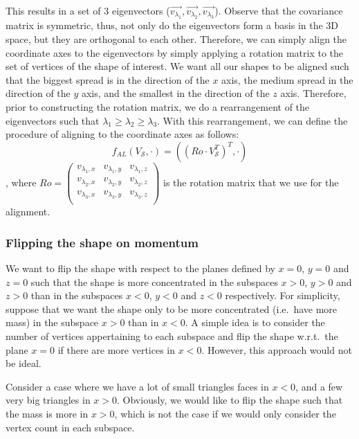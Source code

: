 This results in a set of 3 eigenvectors ($\overrightarrow{v_{\lambda_1}}, \overrightarrow{v_{\lambda_2}}, \overrightarrow{v_{\lambda_3}}$).
Observe that the covariance matrix is symmetric, thus, not only do the eigenvectors form a basis in the 3D space, but they are orthogonal to each other.
Therefore, we can simply align the coordinate axes to the eigenvectors by simply applying a rotation matrix to the set of vertices of the shape of interest.
We want all our shapes to be aligned such that the biggest spread is in the direction of the $x$ axis, the medium
spread in the direction of the $y$ axis, and the smallest in the direction of the $z$ axis.
Therefore, prior to constructing the rotation matrix, we do a rearrangement of the eigenvectors such that $\lambda_1 \geq \lambda_2 \geq \lambda_3$.
With this rearrangement, we can define the procedure of aligning to the coordinate axes as follows:
\begin{equation}
    f_{AL}(V_{\mathcal{S}}, \cdot) = ((Ro \cdot V_{\mathcal{S}}^T)^T, \cdot)    
\end{equation}
, where $Ro = \begin{pmatrix}
        v_{\lambda_1,x} & v_{\lambda_1,y} & v_{\lambda_1,z} \\
        v_{\lambda_2,x} & v_{\lambda_2,y} & v_{\lambda_2,z} \\
        v_{\lambda_3,x} & v_{\lambda_3,y} & v_{\lambda_3,z} \\
        \end{pmatrix}$ 
is the rotation matrix that we use for the alignment. 

\subsubsection{Flipping the shape on momentum}
We want to flip the shape with respect to the planes defined by $x=0$, $y=0$ and $z = 0$ such that the shape is more
concentrated in the subspaces $x > 0$, $y > 0$ and $z > 0$ than in the subspaces $x < 0$, $y < 0$ and $z < 0$ respectively.
For simplicity, suppose that we want the shape only to be more concentrated (i.e.\ have more mass) in the subspace $x>0$ than in $x < 0$.
A simple idea is to consider the number of vertices appertaining to each subspace and flip the shape w.r.t.\ the plane $x=0$ if there are more vertices in $x < 0$.
However, this approach would not be ideal.

Consider a case where we have a lot of small triangles faces in $x < 0$, and a few very big triangles in $x > 0$.
Obviously, we would like to flip the shape such that the mass is more in $x > 0 $, which is not the case if we would
only consider the vertex count in each subspace.

